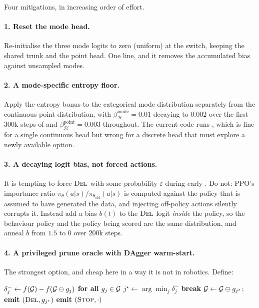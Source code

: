 \documentclass[11pt,a4paper]{article}
\begin{document}
Four mitigations, in increasing order of effort.

\paragraph{1. Reset the mode head.} Re-initialise the three mode logits to zero (uniform)
at the switch, keeping the shared trunk and the point head. One line, and it removes the
accumulated bias against unsampled modes.

\paragraph{2. A mode-specific entropy floor.} Apply the entropy bonus to the categorical
mode distribution separately from the continuous point distribution, with
$\beta_{\mathcal{H}}^{\mathrm{mode}} = 0.01$ decaying to $0.002$ over the first $300$k steps
of \stageII{} and $\beta_{\mathcal{H}}^{\mathrm{point}} = 0.003$ throughout. The current code
runs , which is fine for a single continuous head but wrong for a
discrete head that must explore a newly available option.

\paragraph{3. A decaying logit bias, not forced actions.} It is tempting to force
$\textsc{Del}$ with some probability $\varepsilon$ during early \stageII{}. Do not: PPO's importance
ratio $\pi_\theta(a|s)/\pi_{\theta_{\mathrm{old}}}(a|s)$ is computed against the policy that
is assumed to have generated the data, and injecting off-policy actions silently corrupts
it. Instead add a bias $b(t)$ to the $\textsc{Del}$ logit \emph{inside} the policy, so the behaviour
policy and the policy being scored are the same distribution, and anneal $b$ from $1.5$ to
$0$ over $200$k steps.

\paragraph{4. A privileged prune oracle with DAgger warm-start.} The strongest option, and
cheap here in a way it is not in robotics. Define:

\begin{algorithm}[h]
\small
\caption{\textsc{GreedyPruneOracle}($\Gallery$, $\Guards$, $c^\dagger$)}
\begin{algorithmic}[1]
  \State $\delta^{-}_j \gets f(\mathcal{G}) - f(\mathcal{G} \ominus g_j)$ \textbf{ for all } $g_j \in \mathcal{G}$
  \State $j^\star \gets \arg\min_j \delta^{-}_j$
   \State \textbf{break} \EndIf
  \State $\mathcal{G} \gets \mathcal{G} \ominus g_{j^\star}$; \; \textbf{emit} $(\textsc{Del}, g_{j^\star})$
\EndWhile
\State \textbf{emit} $(\textsc{Stop}, \cdot)$
\end{algorithmic}
\end{algorithm}
\end{document}
